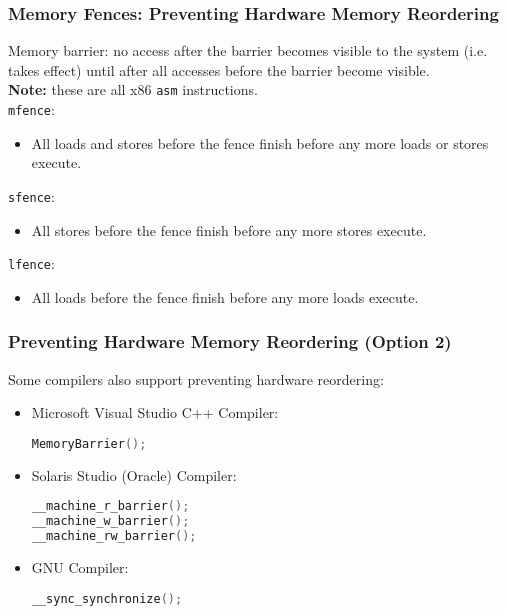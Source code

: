 \begin{frame}
  \frametitle{Memory Fences: Preventing Hardware Memory Reordering}


Memory barrier: no access after the barrier becomes visible to the
system (i.e. takes effect) until after all accesses before the barrier
become visible.\\[1em]

  {\bf Note:} these are all x86 {\tt asm} instructions.\\[1em]
  {\tt mfence}:
  \begin{itemize}
    \item All loads and stores before the fence finish before any more loads or stores execute.
  \end{itemize}
  {\tt sfence}:
  \begin{itemize}
    \item All stores before the fence finish before any more stores execute.
  \end{itemize}
  {\tt lfence}:
  \begin{itemize}
    \item All loads before the fence finish before any more loads execute.
  \end{itemize}
  
\end{frame}

\begin{frame}[fragile]
  \frametitle{Preventing Hardware Memory Reordering (Option 2)}

  
  Some compilers also support preventing hardware reordering:

\begin{itemize}
  \item Microsoft Visual Studio C++ Compiler:
  \begin{lstlisting}[language=C]
MemoryBarrier();
  \end{lstlisting}

  \item Solaris Studio (Oracle) Compiler:
  \begin{lstlisting}[language=C]
__machine_r_barrier();
__machine_w_barrier();
__machine_rw_barrier();
  \end{lstlisting}

  \item GNU Compiler:
  \begin{lstlisting}[language=C]
__sync_synchronize();
  \end{lstlisting}
\end{itemize}
  
\end{frame}

